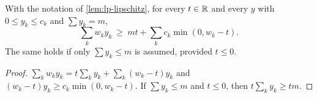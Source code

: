 \begin{lemma}\label{lem:weak-duality}
With the notation of \cref{lem:lp-lipschitz}, for every $t\in\mathbb{R}$ and every $y$ with $0\le y_k\le c_k$ and $\sum y_k=m$,
\[
\sum_kw_ky_k\ \ge\ mt+\sum_kc_k\min(0,w_k-t).
\]
The same holds if only $\sum y_k\le m$ is assumed, provided $t\le0$.
\end{lemma}

\begin{proof}
$\sum_kw_ky_k=t\sum_ky_k+\sum_k(w_k-t)y_k$ and $(w_k-t)y_k\ge c_k\min(0,w_k-t)$. If $\sum y_k\le m$ and $t\le0$, then $t\sum_ky_k\ge tm$.
\end{proof}

